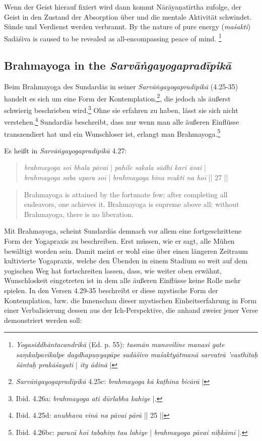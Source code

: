Wenn der Geist hierauf fixiert wird dann kommt Nārāyaṇatīrtha zufolge, der Geist in den Zustand der Absorption über und die mentale Aktivität schwindet. Sünde und Verdienst werden verbrannt. By the nature of pure energy (\textit{maśakti}) Sadāśiva is caused to be revealed as all-encompassing peace of mind. \footnote{\textit{Yogasiddhāntacandrikā} (Ed. p. 55): \textit{tasmān manovilīne manasi gate saṃkalpavikalpe dagdhapuṇyapāpe sadāśivo maśaktyātmanā sarvatrā 'vasthitaḥ śāntaḥ prakāśayati} | \textit{ity ādinā} |}

\subsection{Brahmayoga in the \textit{Sarvāṅgayogapradīpikā}}

Beim Brahmayoga des Sundardās in seiner \textit{Sarvāṅgayogapradīpikā} (4.25-35) handelt es sich um eine Form der Kontemplation,\footnote{\textit{Sarvāṅgayogapradīpikā} 4.25c: \textit{brahmayoga kā kaṭhina bicārā} |}, die jedoch als äußerst schwierig beschrieben wird.\footnote{Ibid. 4.26a: \textit{brahmayoga ati dūrlabha kahiye} |.} Ohne sie erfahren zu haben, lässt sie sich nicht verstehen.\footnote{Ibid. 4.25d: \textit{anubhava vinā na pāvai pārā} || 25 ||} Sundardās beschreibt, dass nur wenn man alle äußeren Einflüsse transzendiert hat und ein Wunschloser ist, erlangt man Brahmayoga.\footnote{Ibid. 4.26bc: \textit{paracā hoī tabahiṃ tau lahiye} | \textit{brahmayoga pāvai niḥkāmī} |.}

Es heißt in \textit{Sarvāṅgayogapradīpikā} 4.27:
\begin{quote}
\textit{brahmayoga soī bhala pāvai} | \textit{pahile sakala sādhi kari āvai} |\\
\textit{brahmayoga saba upara soī} | \textit{brahmayoga bina mukti na hoī} || 27 ||
\end{quote}
\begin{quote}
Brahmayoga is attained by the fortunate few; after completing all endeavors, one achieves it. 
Brahmayoga is supreme above all; without Brahmayoga, there is no liberation.
\end{quote}

Mit Brahmayoga, scheint Sundardās demnach vor allem eine fortgeschrittene Form der Yogapraxis zu beschreiben. Erst müssen, wie er sagt, alle Mühen bewältigt worden sein. Damit meint er wohl eine über einen längeren Zeitraum kultivierte Yogapraxis, welche den Übenden in einem Stadium so weit auf dem yogischen Weg hat fortschreiten lassen, dass, wie weiter oben erwähnt, Wunschloskeit eingetreten ist in dem alle äußeren Einflüsse keine Rolle mehr spielen. In den Versen 4.29-35 beschreibt er diese mystische Form der Kontemplation, bzw. die Innenschau dieser mystischen Einheitserfahrung in Form einer Verbalisierung dessen aus der Ich-Perspektive, die anhand zweier jener Verse demonstriert werden soll: 

